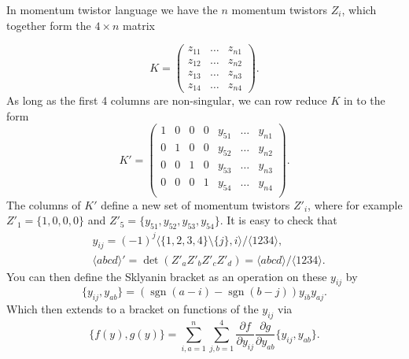 \documentclass[12pt]{article}
\DeclareMathOperator{\sgn}{sgn}
\def\ket#1{\langle #1 \rangle}
\begin{document}
\thispagestyle{fancyplain}
 
\fancyhf{}
 
\cfoot{\fancyplain{}{\thepage}}


In momentum twistor language we have the $n$ momentum twistors $Z_i$, which together form the $4 \times n$ matrix

\begin{equation}	
K = \left(\begin{array}{ccc}
z_{11} & \ldots & z_{n1} \\
z_{12} & \ldots & z_{n2} \\
z_{13} & \ldots & z_{n3} \\
z_{14} & \ldots & z_{n4}\end{array}\right).
\end{equation}
As long as the first 4 columns are non-singular, we can row reduce $K$ in to the form
\begin{equation}
K'=\left(
\begin{array}{ccccccc}
 1 & 0 & 0 & 0 & y_{51} & \ldots  & y_{n1} \\
 0 & 1 & 0 & 0 & y_{52} & \ldots  & y_{n2} \\
 0 & 0 & 1 & 0 & y_{53} & \ldots  & y_{n3} \\
 0 & 0 & 0 & 1 & y_{54} & \ldots  & y_{n4} \\
\end{array}
\right).
\end{equation}
The columns of $K'$ define a new set of momentum twistors $Z'_i$, where for example $Z'_1 = \{1,0,0,0\}$ and $Z'_5 = \{y_{51},y_{52},y_{53},y_{54}\}$. It is easy to check that 
\begin{align}
	&y_{ij} = (-1)^j \ket{\{1,2,3,4\}\setminus\{j\},i}/\ket{1234},\label{eq:numerics}\\
	&\ket{abcd}' = \det(Z'_a Z'_b Z'_c Z'_d) = \ket{abcd}/\ket{1234}.
\end{align}
You can then define the Sklyanin bracket as an operation on these $y_{ij}$ by
\begin{equation}
	\{y_{ij},y_{ab}\} = (\sgn(a-i) - \sgn(b-j)) y_{ib} y_{aj}.
\end{equation}
Which then extends to a bracket on functions of the $y_{ij}$ via
\begin{equation}\label{eq:def}
	\{f(y), g(y)\} =  \sum_{i,a=1}^n\sum_{j,b=1}^4\frac{\partial f}{\partial y_{ij}}  \frac{\partial g}{\partial y_{ab}} 
\{y_{ij}, y_{ab}\}.
\end{equation}
\end{document}
